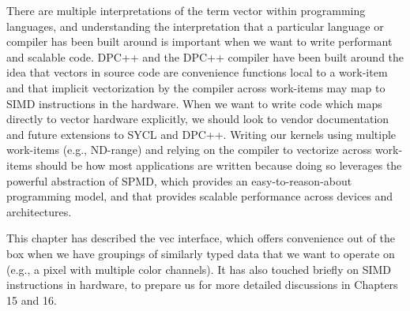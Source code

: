 
There are multiple interpretations of the term vector within programming languages, and understanding the interpretation that a particular language or compiler has been built around is important when we want to write performant and scalable code. DPC++ and the DPC++ compiler have been built around the idea that vectors in source code are convenience functions local to a work-item and that implicit vectorization by the compiler across work-items may map to SIMD instructions in the hardware. When we want to write code which maps directly to vector hardware explicitly, we should look to vendor documentation and future extensions to SYCL and DPC++. Writing our kernels using multiple work-items (e.g., ND-range) and relying on the compiler to vectorize across work-items should be how most applications are written because doing so leverages the powerful abstraction of SPMD, which provides an easy-to-reason-about programming model, and that provides scalable performance across devices and architectures.\par

This chapter has described the vec interface, which offers convenience out of the box when we have groupings of similarly typed data that we want to operate on (e.g., a pixel with multiple color channels). It has also touched briefly on SIMD instructions in hardware, to prepare us for more detailed discussions in Chapters 15 and 16.\par

\newpage
